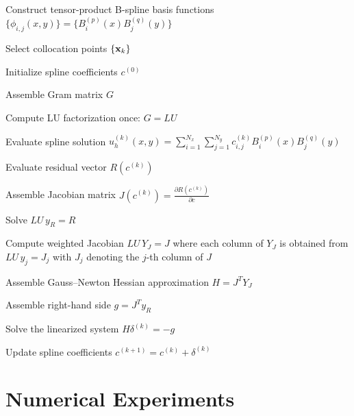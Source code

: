 \documentclass[review]{elsarticle}
\begin{document}
\begin{algorithm}
\caption{Gauss--Newton Optimization for IGA--ODIL}
\begin{algorithmic}[1]

\State Construct tensor-product B-spline basis functions
$
\{\phi_{i,j}(x,y)\}
=
\{B_i^{(p)}(x)B_j^{(q)}(y)\}
$

\State Select collocation points $\{{\bf x}_k\}$

\State Initialize spline coefficients $c^{(0)}$

\State Assemble Gram matrix $G$

\State Compute LU factorization once:
$
G = LU
$


    \State Evaluate spline solution
    $
    u_h^{(k)}(x,y)
    =
    \sum_{i=1}^{N_x}
    \sum_{j=1}^{N_y}
    c_{i,j}^{(k)}
    B_i^{(p)}(x)
    B_j^{(q)}(y)
    $

    \State Evaluate residual vector
    $
    R(c^{(k)})
    $

    \State Assemble Jacobian matrix
    $
    J(c^{(k)})
    =
    \frac{\partial R(c^{(k)})}{\partial c}
    $

    \State Solve
    $
    LU\, y_R = R
    $

    \State Compute weighted Jacobian
    $
    LU\, Y_J = J
    $
    where each column of $Y_J$ is obtained from
    $
    LU\, y_j = J_j
    $
    with $J_j$ denoting the $j$-th column of $J$

    \State Assemble Gauss--Newton Hessian approximation
    $
    H = J^T Y_J
    $

    \State Assemble right-hand side
    $
    g = J^T y_R
    $

    \State Solve the linearized system
    $
    H\delta^{(k)}
    =
    -g
    $

    \State Update spline coefficients
    $
    c^{(k+1)}
    =
    c^{(k)}
    +
    \delta^{(k)}
    $

\EndWhile


\end{algorithmic}
\end{algorithm}

\section{Numerical Experiments}
\end{document}
